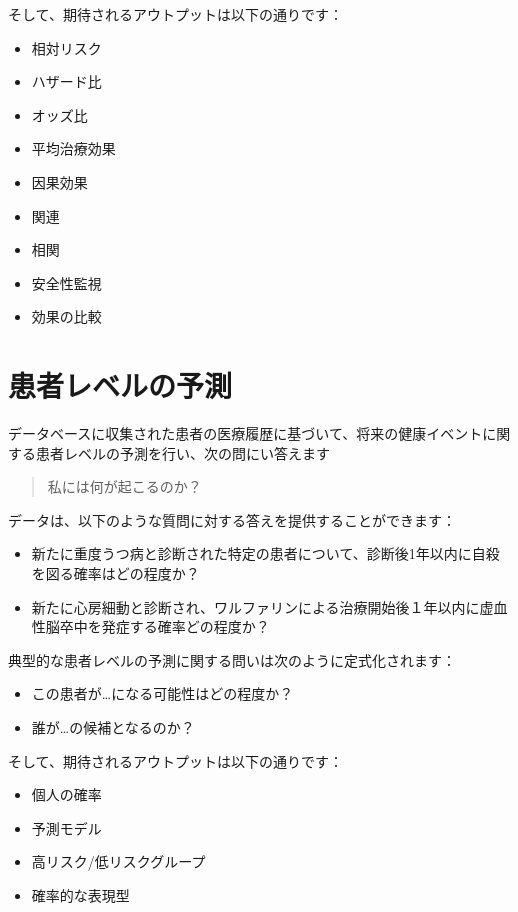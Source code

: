 \documentclass[
  11pt]{book}
\providecommand{\tightlist}{%
  \setlength{\itemsep}{0pt}\setlength{\parskip}{0pt}}
\theoremstyle{definition}
\theoremstyle{definition}
\theoremstyle{definition}
\theoremstyle{definition}
\theoremstyle{remark}
\begin{document}
そして、期待されるアウトプットは以下の通りです：

\begin{itemize}
\tightlist
\item
  相対リスク
\item
  ハザード比
\item
  オッズ比
\item
  平均治療効果
\item
  因果効果
\item
  関連
\item
  相関
\item
  安全性監視
\item
  効果の比較
\end{itemize}

\section{患者レベルの予測}\label{ux60a3ux8005ux30ecux30d9ux30ebux306eux4e88ux6e2c}


データベースに収集された患者の医療履歴に基づいて、将来の健康イベントに関する患者レベルの予測を行い、次の問にい答えます

\begin{quote}
私には何が起こるのか？
\end{quote}

データは、以下のような質問に対する答えを提供することができます：

\begin{itemize}
\tightlist
\item
  新たに重度うつ病と診断された特定の患者について、診断後1年以内に自殺を図る確率はどの程度か？
\item
  新たに心房細動と診断され、ワルファリンによる治療開始後１年以内に虚血性脳卒中を発症する確率どの程度か？
\end{itemize}

典型的な患者レベルの予測に関する問いは次のように定式化されます：

\begin{itemize}
\tightlist
\item
  この患者が\ldots になる可能性はどの程度か？
\item
  誰が\ldots の候補となるのか？
\end{itemize}

そして、期待されるアウトプットは以下の通りです：

\begin{itemize}
\tightlist
\item
  個人の確率
\item
  予測モデル
\item
  高リスク/低リスクグループ
\item
  確率的な表現型
\end{itemize}
\end{document}
